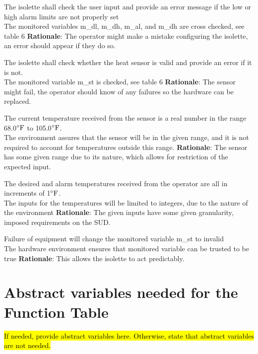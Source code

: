 \documentclass[fontsize=12pt,paper=letter,twoside]{scrartcl}
\begin{document}
{The isolette shall check the user input and provide an error message if the low or high alarm limits are not properly set\\}
{The monitored variables m\_dl, m\_dh, m\_al, and m\_dh are cross checked, see table 6}
\label{R5}
\textbf{Rationale}: The operator might make a mistake configuring the isolette, an error should appear if they do so.

{The isolette shall check whether the heat sensor is valid and provide an error if it is not.\\}
{The monitored variable m\_st is checked, see table 6}
\label{R6}
\textbf{Rationale}: The sensor might fail, the operator should know of any failures so the hardware can be replaced.

{The current temperature received from the sensor is a real number in the range 68.0$^{\circ}\mathrm{F}$ to 105.0$^{\circ}\mathrm{F}$.\\}
{The environment assures that the sensor will be in the given range, and it is not required to account for temperatures outside this range.}
\label{E7}
\textbf{Rationale}: The sensor has some given range due to its nature, which allows for restriction of the expected input.

{The desired and alarm temperatures received from the operator are all in increments of 1$^{\circ}\mathrm{F}$.\\}
{The inputs for the temperatures will be limited to integers, due to the nature of the environment}
\label{E8}
\textbf{Rationale}: The given inputs have some given granularity, imposed requirements on the SUD.

{Failure of equipment will change the monitored variable m\_st to invalid\\}
{The hardware environment ensures that monitored variable can be trusted to be true}
\label{E9}
\textbf{Rationale}: This allows the isolette to act predictably.

\section{Abstract variables needed for the Function Table}
\hl{If needed, provide abstract variables here. Otherwise, state that abstract variables are not needed.}
\end{document}
